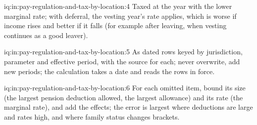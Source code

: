 \begin{solution}{iq:in:pay-regulation-and-tax-by-location:4}
Taxed at the year with the lower marginal rate; with deferral, the vesting year's rate applies, which is worse if income
rises and better if it falls (for example after leaving, when vesting continues as a good leaver).
\end{solution}

\begin{solution}{iq:in:pay-regulation-and-tax-by-location:5}
As dated rows keyed by jurisdiction, parameter and effective period, with the source for each; never overwrite, add new
periods; the calculation takes a date and reads the rows in force.
\end{solution}

\begin{solution}{iq:in:pay-regulation-and-tax-by-location:6}
For each omitted item, bound its size (the largest pension deduction allowed, the largest allowance) and its rate (the
marginal rate), and add the effects; the error is largest where deductions are large and rates high, and where family
status changes brackets.
\end{solution}
